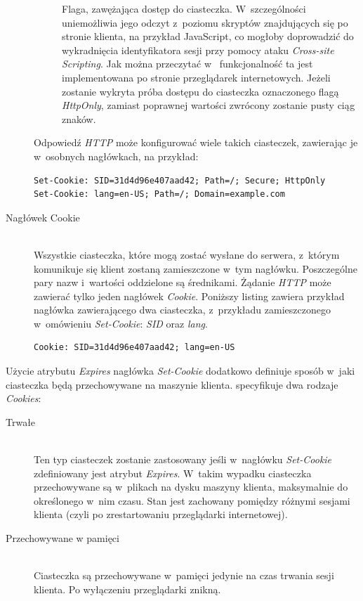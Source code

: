 \documentclass[11pt]{aghdpl}
\begin{document}
\begin{description}
\begin{description}
Flaga, zawężająca dostęp do ciasteczka. W~szczególności uniemożliwia jego odczyt z~poziomu skryptów znajdujących się po stronie klienta, na przykład JavaScript, co mogłoby doprowadzić do wykradnięcia identyfikatora sesji przy pomocy ataku \emph{Cross-site Scripting}. Jak można przeczytać w~\cite{HtOn} funkcjonalność ta jest implementowana po stronie przeglądarek internetowych. Jeżeli zostanie wykryta próba dostępu do ciasteczka oznaczonego flagą \emph{HttpOnly}, zamiast poprawnej wartości zwrócony zostanie pusty ciąg znaków. 
\end{description}
Odpowiedź \emph{HTTP} może konfigurować wiele takich ciasteczek, zawierając je w~osobnych nagłówkach, na przykład:
\begin{lstlisting}
Set-Cookie: SID=31d4d96e407aad42; Path=/; Secure; HttpOnly
Set-Cookie: lang=en-US; Path=/; Domain=example.com
\end{lstlisting}
\item[Nagłówek Cookie] \hfill \\
Wszystkie ciasteczka, które mogą zostać wysłane do serwera, z~którym komunikuje się klient zostaną zamieszczone w~tym nagłówku. Poszczególne pary nazw i~wartości oddzielone są średnikami. Żądanie \emph{HTTP} może zawierać tylko jeden nagłówek \emph{Cookie}. Poniższy listing zawiera przykład nagłówka zawierającego dwa ciasteczka, z~przykładu zamieszczonego w~omówieniu \emph{Set-Cookie}: \emph{SID} oraz \emph{lang}.
\begin{lstlisting}
Cookie: SID=31d4d96e407aad42; lang=en-US
\end{lstlisting}
\end{description}

Użycie atrybutu \emph{Expires} nagłówka \emph{Set-Cookie} dodatkowo definiuje sposób w~jaki ciasteczka będą przechowywane na maszynie klienta. \cite{MsC} specyfikuje dwa rodzaje \emph{Cookies}:

\begin{description}
\item[Trwałe] \hfill \\
Ten typ ciasteczek zostanie zastosowany jeśli w~nagłówku \emph{Set-Cookie} zdefiniowany jest atrybut \emph{Expires}. W~takim wypadku ciasteczka przechowywane są w~plikach na dysku maszyny klienta, maksymalnie do określonego w~nim czasu. Stan jest zachowany pomiędzy różnymi sesjami klienta (czyli po zrestartowaniu przeglądarki internetowej).
\item[Przechowywane w pamięci] \hfill \\
Ciasteczka są przechowywane w~pamięci jedynie na czas trwania sesji klienta. Po wyłączeniu przeglądarki znikną.
\end{description}
\end{document}
